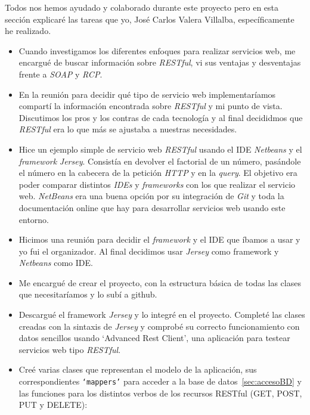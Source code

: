 
Todos nos hemos ayudado y colaborado durante este proyecto pero en esta sección explicaré las tareas que yo, José Carlos Valera Villalba, específicamente he realizado.

\begin{itemize}
\item
Cuando investigamos los diferentes enfoques para realizar servicios web, me encargué de buscar información sobre \textit{RESTful}, vi sus ventajas y desventajas frente a \textit{SOAP} y \textit{RCP}.

\item
En la reunión para decidir qué tipo de servicio web implementaríamos compartí la información encontrada sobre \textit{RESTful} y mi punto de vista. Discutimos los pros y los contras de cada tecnología y al final decididmos que \textit{RESTful} era lo que más se ajustaba a nuestras necesidades.

\item
Hice un ejemplo simple de servicio web \textit{RESTful} usando el IDE \textit{Netbeans} y el \emph{framework} \textit{Jersey}. Consistía en devolver el factorial de un número, pasándole el número en la cabecera de la petición \textit{HTTP} y en la \textit{query}. El objetivo era poder comparar distintos \textit{IDEs} y  \emph{frameworks} con los que realizar el servicio web. \textit{NetBeans} era una buena opción por su integración de \textit{Git} y toda la documentación online que hay para desarrollar servicios web usando este entorno.

\item
Hicimos una reunión para decidir el \emph{framework} y el IDE que íbamos a usar y yo fui el organizador. Al final decidimos usar \textit{Jersey} como framework y \textit{Netbeans} como IDE.

\item
Me encargué de crear el proyecto, con la estructura básica de todas las clases que necesitaríamos y lo subí a github.

\item
Descargué el framework \textit{Jersey} y lo integré en el proyecto. Completé las clases creadas con la sintaxis de \textit{Jersey} y comprobé su correcto funcionamiento con datos sencillos usando `Advanced Rest Client', una aplicación para testear servicios web tipo \textit{RESTful}.

\item
Creé varias clases que representan el modelo de la aplicación, sus correspondientes \texttt{`mappers'} para acceder a la base de datos~\ref{sec:accesoBD} y las funciones para los distintos verbos de los recursos RESTful (GET, POST, PUT y DELETE):


\end{itemize}
